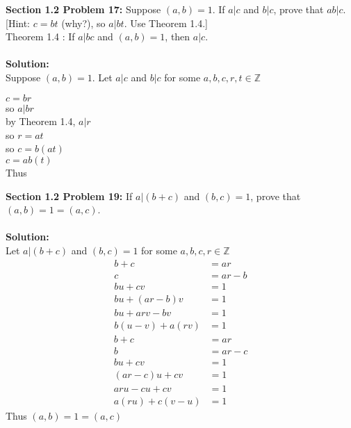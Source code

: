 \documentclass[12pt]{article}
\begin{document}
\newpage

\noindent \textbf{Section 1.2 Problem 17:} 
Suppose $(a, b) = 1$. If $a|c$ and $b|c$, prove that $ab|c$. [Hint: $c = bt$ (why?), so $a|bt$. Use Theorem 1.4.] \\
Theorem 1.4 : If $a|bc$ and $(a, b)= 1$, then $a|c$.  
\\\\
\noindent \textbf{Solution:} \\
Suppose $(a, b) = 1$. Let $a|c$ and $b|c$ for some $a,b,c,r,t \in \mathbb{Z}$
	\begin{center}
		$c = br$ \\
		so $a|br$ \\
		by Theorem 1.4, $a|r$ \\
		so $r = at$ \\
		so $c = b(at)$ \\
		$c = ab(t)$ \\
		Thus 
	\end{center}

\vspace{\baselineskip}
\noindent \textbf{Section 1.2 Problem 19:} 
If $a|(b + c)$ and $(b, c) = 1$, prove that $(a, b) = 1 = (a, c)$. 
\\\\
\noindent \textbf{Solution:} \\
Let $a|(b+c)$ and $(b,c) = 1$ for some $a,b,c,r \in \mathbb{Z}$
	\begin{align}
		b + c &= ar \\
		c &= ar - b \\
		bu + cv &= 1 \\
		bu + (ar-b)v &= 1 \\
		bu + arv - bv &= 1 \\
		b(u-v) + a(rv) &= 1 
	\end{align}
	\begin{align}
		b + c &= ar \\
		b &= ar - c \\
		bu + cv &= 1 \\
		(ar-c)u + cv &= 1 \\
		aru - cu + cv &= 1 \\
		a(ru) + c(v-u) &= 1
	\end{align}
Thus \boldmath $(a,b) = 1 = (a,c)$	
\end{document}
